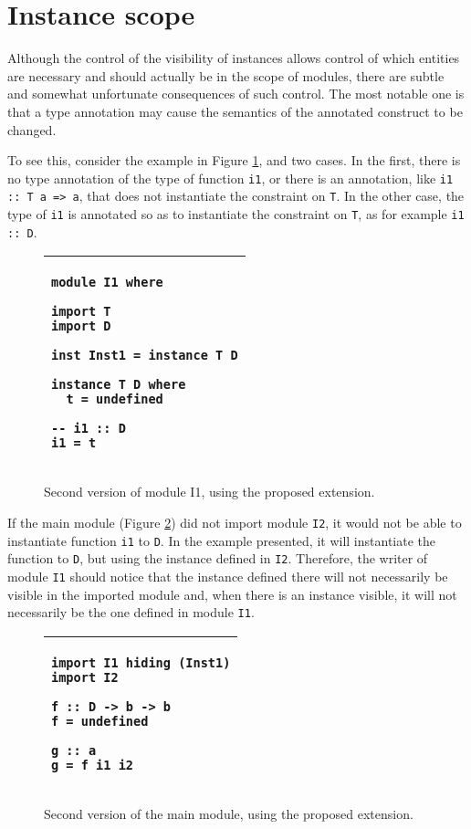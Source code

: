 \documentclass[msc]{ppgccufmg}
\begin{document}
\section{Instance scope}
\label{Instance-scope}
Although the control of the visibility of instances allows control of
which entities are necessary and should actually be in the scope of
modules, there are subtle and somewhat unfortunate consequences of
such control. The most notable one is that a type annotation may cause
the semantics of the annotated construct to be changed. 

To see this, consider the example in Figure \ref{I1-2}, and two cases.
In the first, there is no type annotation of the type of function
\texttt{i1}, or there is an annotation, like \texttt{i1 :: T a => a},
that does not instantiate the constraint on \texttt{T}.  In the other
case, the type of \texttt{i1} is annotated so as to instantiate the
constraint on \texttt{T}, as for example \texttt{i1 :: D}.

\begin{figure}
\caption{Second version of module I1, using the proposed extension.\label{I1-2}}
\begin{tabular}{|p{\textwidth}|}
\hline
\begin{verbatim}
module I1 where

import T
import D

inst Inst1 = instance T D

instance T D where
  t = undefined

-- i1 :: D
i1 = t
\end{verbatim}
\\
\hline
\end{tabular}
\end{figure}

If the main module (Figure \ref{main-2})
did not import module \texttt{I2}, it would not be able to instantiate function
\texttt{i1} to \texttt{D}.  In the example presented, it will instantiate the
function to \texttt{D}, but using the instance defined in \texttt{I2}.
Therefore, the writer of module \texttt{I1} should notice that the instance
defined there will not necessarily be visible in the imported module and, when
there is an instance visible, it will not necessarily be the one defined in
module \texttt{I1}.

\begin{figure}
\caption{Second version of the main module, using the proposed
  extension.\label{main-2}}
\begin{tabular}{|p{\textwidth}|}
\hline
\begin{verbatim}
import I1 hiding (Inst1)
import I2

f :: D -> b -> b
f = undefined

g :: a
g = f i1 i2
\end{verbatim}
\\
\hline
\end{tabular}
\end{figure}
\end{document}
